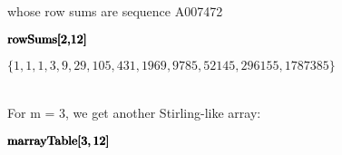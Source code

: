\documentclass{article}
\begin{document}
\begin{doublespace}
\noindent\(\pmb{\text{}}\)
\end{doublespace}

whose row sums are sequence A007472

\begin{doublespace}
\noindent\(\pmb{\text{rowSums}[2,}\\
\pmb{12]}\)
\end{doublespace}

\begin{doublespace}
\noindent\(\{1,1,1,3,9,29,105,431,1969,9785,52145,296155,1787385\}\)
\end{doublespace}

\\
For m = 3, we get another Stirling-like array:

\begin{doublespace}
\noindent\(\pmb{\text{marrayTable}[}\\
\pmb{3,12]}\)
\end{doublespace}
\end{document}
